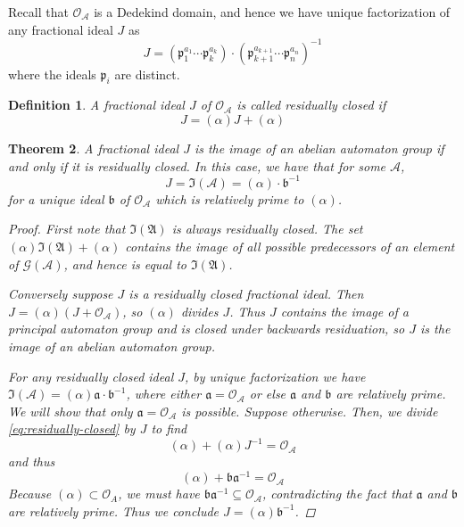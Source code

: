 \documentclass[12pt, letterpaper]{article}
\newcommand{\A}{\mathcal A}
\newcommand{\princ}{\mathfrak A}
\newcommand{\gp}{\mathcal G}
\newcommand{\ideal}{\mathfrak{I}}
\newtheorem{thm}{Theorem}[section]
\newtheorem{defn}[thm]{Definition}
\begin{document}
Recall that $\mathcal{O}_\A$ is a Dedekind domain, and hence we have unique
factorization of any fractional ideal $J$ as
\[
    J = (\mathfrak{p}_1^{a_1} \cdots \mathfrak{p}_k^{a_k})
    \cdot
    {(\mathfrak{p}_{k+1}^{a_{k+1}} \cdots \mathfrak{p}_n^{a_n})}^{-1}
\]
where the ideals $\mathfrak{p}_i$ are distinct.

\begin{defn}\label{defn:residually_closed}
    A fractional ideal $J$ of $\mathcal O_\A$ is called residually closed if
    \begin{equation}\label{eq:residually-closed}
        J = (\alpha) J + (\alpha)
    \end{equation}
\end{defn}

\begin{thm}\label{thm:ideal_structure}
    A fractional ideal $J$ is the image of an abelian automaton group if and
    only if it is residually closed. In this case, we have that for some $\A$,
    \[
        J = \ideal(\A) = (\alpha) \cdot \mathfrak{b}^{-1}
    \]
    for a unique ideal $\mathfrak{b}$ of $\mathcal{O}_\A$ which is relatively
    prime to $(\alpha)$.

    \begin{proof}
        First note that $\ideal(\princ)$ is always residually closed.
        The set $(\alpha) \ideal(\princ) + (\alpha)$ contains the image of all
        possible predecessors of an element of $\gp(\A)$, and hence is equal to
        $\ideal(\princ)$.

        Conversely suppose $J$ is a residually closed fractional ideal.
        Then $J = (\alpha) (J + \mathcal O_\A)$, so $(\alpha)$ divides
        $J$. Thus $J$ contains the image of a principal automaton group and
        is closed under backwards residuation, so $J$ is the image of an
        abelian automaton group.

        For any residually closed ideal $J$, by unique factorization we have
        $\ideal(\A) = (\alpha) \mathfrak{a} \cdot \mathfrak{b}^{-1}$, where
        either $\mathfrak{a} = \mathcal O_\A$ or else $\mathfrak{a}$ and
        $\mathfrak{b}$ are relatively prime. We will show that only
        $\mathfrak{a} = \mathcal O_\A$ is possible. Suppose otherwise. Then, we
        divide \cref{eq:residually-closed} by $J$ to find
        \[
            (\alpha) + (\alpha)J^{-1} = \mathcal O_\A
        \]
        and thus
        \[
            (\alpha) + \mathfrak{b} \mathfrak{a}^{-1} = \mathcal O_\A
        \]
        Because $(\alpha) \subset \mathcal O_A$, we must have
        $\mathfrak{b} \mathfrak{a}^{-1} \subseteq \mathcal O_\A$, contradicting
        the fact that $\mathfrak{a}$ and $\mathfrak{b}$ are relatively prime.
        Thus we conclude $J = (\alpha) \mathfrak{b}^{-1}$.
    \end{proof}
\end{thm}
\end{document}
